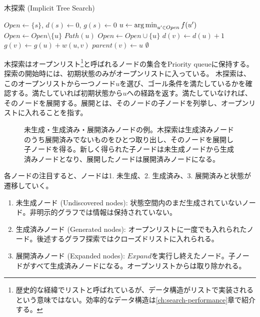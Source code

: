 \begin{algorithm}[h]
\caption{木探索 (Implicit Tree Search)}
\label{alg:implicit-tree-search}
	$Open \leftarrow \{s\}$, $d(s) \leftarrow 0$, $g(s) \leftarrow 0$\;
	 {
                $u \leftarrow \argmin_{u' \in Open} f(u')$ \;
		$Open \leftarrow Open \setminus \{u\} $\;
		 {
			\Return $Path(u)$\;
		}
		 {
 			$Open \leftarrow Open \cup \{u\}$\;
		        $d(v) \leftarrow d(u) + 1$\;
		        $g(v) \leftarrow g(u) + w(u, v)$\;
			$parent(v) \leftarrow u$\;
		}
 	}
	\Return $\emptyset$\;
\end{algorithm}
    
木探索はオープンリスト\footnote{歴史的な経緯でリストと呼ばれているが、データ構造がリストで実装されるという意味ではない。効率的なデータ構造は\ref{ch:search-performance}章で紹介する。}と呼ばれるノードの集合をPriority queueに保持する。探索の開始時には、初期状態のみがオープンリストに入っている。
木探索は、このオープンリストから一つノード$u$を選び、ゴール条件を満たしているかを確認する。満たしていれば初期状態から$u$への経路を返す。満たしていなければ、そのノードを展開する。展開とは、そのノードの子ノードを列挙し、オープンリストに入れることを指す。

\begin{figure}
  \centering
  \begin{tikzpicture}[scale=0.6]
    
  \end{tikzpicture}
  \caption{未生成・生成済み・展開済みノードの例。木探索は生成済みノードのうち展開済みでないものをひとつ取り出し、そのノードを展開し子ノードを得る。新しく得られた子ノードは未生成ノードから生成済みノードとなり、展開したノードは展開済みノードになる。}
  \label{fig:node-life}
\end{figure}

各ノードの注目すると、ノードは1. 未生成、2. 生成済み、3. 展開済みと状態が遷移していく。

\begin{enumerate}
\item 未生成ノード (Undiscovered nodes): 状態空間内のまだ生成されていないノード。非明示的グラフでは情報は保持されていない。
\item 生成済みノード (Generated nodes): オープンリストに一度でも入れられたノード。後述するグラフ探索ではクローズドリストに入れられる。
\item 展開済みノード (Expanded nodes): $Expand$を実行し終えたノード。子ノードがすべて生成済みノードになる。オープンリストからは取り除かれる。
\end{enumerate}

